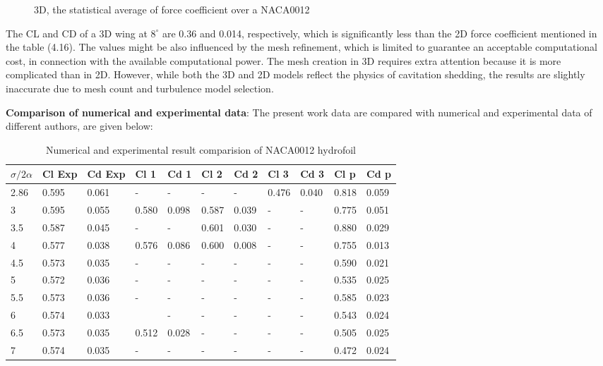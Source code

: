 \begin{figure}[H]
    \centering
    \qquad
  \caption{3D, the statistical average of force coefficient  over a NACA0012}
  \label{fig:fig16}
\end{figure}
The CL and CD of a 3D wing at $8^ {\circ}$ are 0.36 and 0.014, respectively, which is significantly less than the 2D force coefficient mentioned in the table (4.16).
The values might be also influenced by the mesh refinement, which is limited to guarantee an acceptable computational cost, in connection with the available computational power.
The mesh creation in 3D requires extra attention because it is more complicated than in 2D. However, while both the 3D and 2D models reflect the physics 
of cavitation shedding, the results are slightly inaccurate due to mesh count and turbulence model selection. 

\textbf{Comparison of numerical and experimental data}: The present work data are compared with numerical and experimental data of different authors, are given below:
\begin{table}[h]
\centering
\begin{tabular}{|l|l|l|l|l|l|l|l|l|l|l|}
\hline
\rowcolor{gray!20} ${\sigma}/{2\alpha}$& Cl Exp &Cd Exp  & Cl 1 & Cd 1 &Cl 2  &Cd 2 &Cl 3  &Cd 3  & Cl p &Cd p  \\ \hline
2.86 &0.595  & 0.061 &- &-  &-  & - &0.476  & 0.040 & 0.818 &0.059  \\ \hline
 3&0.595  &0.055  &0.580  &0.098 &0.587  &0.039  &-  &-  &0.775  &0.051  \\ \hline
 3.5&0.587  &0.045  &-  & - &0.601  &0.030  &-  & - & 0.880 &0.029 \\ \hline
4 & 0.577 &0.038  &0.576  &0.086  &0.600  &0.008  &-  & - &0.755 &0.013  \\ \hline
4.5 &0.573  &0.035  &-  &-  & - &- & - & - & 0.590 &0.021  \\ \hline
 5&0.572  &0.036  &-  &-  & - & - & - &-  &0.535  & 0.025 \\ \hline
 5.5& 0.573 & 0.036 &-  & - & - & - & - & -  &0.585  &0.023  \\ \hline
6 &0.574  & 0.033 &  &-  &-  & - & - & - & 0.543 &0.024  \\ \hline
6.5 & 0.573 & 0.035 &0.512  &0.028  & - &- & - & - & 0.505 & 0.025 \\ \hline
 7 & 0.574 & 0.035 &- & - & - & - & - &-  & 0.472 & 0.024 \\ \hline
\end{tabular}
\caption{Numerical and experimental result comparision of NACA0012 hydrofoil}
\label{fig:fig16}
\end{table}

